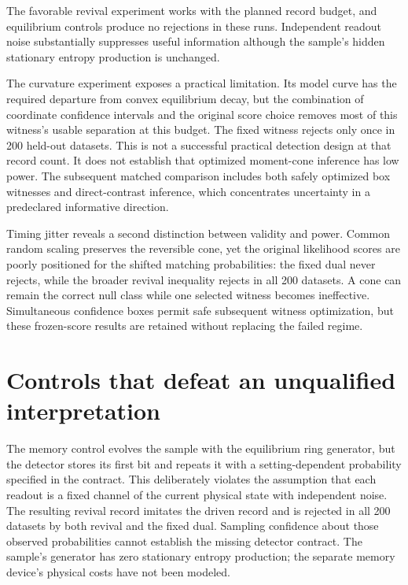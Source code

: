 The favorable revival experiment works with the planned record budget,
and equilibrium controls produce no rejections in these runs. Independent
readout noise substantially suppresses useful information although the
sample's hidden stationary entropy production is unchanged.

The curvature experiment exposes a practical limitation. Its model curve
has the required departure from convex equilibrium decay, but the
combination of coordinate confidence intervals and the original score
choice removes most of this witness's usable separation at this budget.
The fixed witness rejects only once in 200 held-out datasets.
This is not a successful practical detection design at that record count.
It does not establish that optimized moment-cone inference has low power.
The subsequent matched comparison includes both safely optimized box
witnesses and direct-contrast inference, which concentrates uncertainty
in a predeclared informative direction.

Timing jitter reveals a second distinction between validity and power.
Common random scaling preserves the reversible cone, yet the original
likelihood scores are poorly positioned for the shifted matching
probabilities: the fixed dual never rejects, while the broader revival
inequality rejects in all 200 datasets. A cone can remain the correct
null class while one selected witness becomes ineffective. Simultaneous
confidence boxes permit safe subsequent witness optimization, but these
frozen-score results are retained without replacing the failed regime.

\section{Controls that defeat an unqualified interpretation}

The memory control evolves the sample with the equilibrium ring generator,
but the detector stores its first bit and repeats it with a
setting-dependent probability specified in the contract. This deliberately
violates the assumption that each readout is a fixed channel of the current
physical state with independent noise. The resulting revival record
imitates the driven record and is rejected in all 200 datasets by both
revival and the fixed dual. Sampling confidence about those observed
probabilities cannot establish the missing detector contract. The
sample's generator has zero stationary entropy production; the separate
memory device's physical costs have not been modeled.

